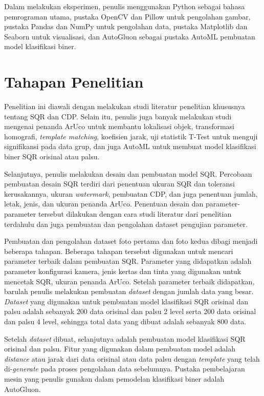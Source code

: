 Dalam melakukan eksperimen, penulis menggunakan Python sebagai bahasa pemrograman utama, pustaka OpenCV dan Pillow untuk pengolahan gambar, pustaka Pandas dan NumPy untuk pengolahan data, pustaka Matplotlib dan Seaborn untuk visualisasi, dan AutoGluon sebagai pustaka AutoML pembuatan model klasifikasi biner.


\section{Tahapan Penelitian}
Penelitian ini diawali dengan melakukan studi literatur penelitian khususnya tentang SQR dan CDP. Selain itu, penulis juga banyak melakukan studi mengenai
penanda ArUco untuk membantu lokalisasi objek, transformasi homografi, \emph{template matching}, koefisien jarak, uji statistik T-Test untuk menguji
signifikansi pada data grup, dan juga AutoML untuk membuat model klasifikasi biner SQR orisinal atau palsu.

Selanjutnya, penulis melakukan desain dan pembuatan model SQR. Percobaan pembuatan desain SQR terdiri dari penentuan ukuran SQR dan toleransi kerusakannya,
ukuran \emph{watermark}, pembuatan CDP, dan juga penentuan jumlah, letak, jenis, dan ukuran penanda ArUco. Penentuan desain dan parameter-parameter tersebut
dilakukan dengan cara studi literatur dari penelitian terdahulu dan juga pembuatan dan pengolahan dataset pengujian parameter.

Pembuatan dan pengolahan dataset foto pertama dan foto kedua dibagi menjadi beberapa tahapan. Beberapa tahapan tersebut digunakan untuk mencari parameter
terbaik dalam pembuatan SQR. Parameter yang didapatkan adalah parameter konfigurasi kamera, jenis kertas dan tinta yang digunakan untuk mencetak SQR, ukuran
penanda ArUco. Setelah parameter terbaik didapatkan, barulah penulis melakukan pembuatan \emph{dataset} dengan jumlah data yang besar. \emph{Dataset} yang
digunakan untuk pembuatan model klasifikasi SQR orisinal dan palsu adalah sebanyak 200 data orisinal dan palsu 2 level serta 200 data orisinal dan palsu 4
level, sehingga total data yang dibuat adalah sebanyak 800 data.

Setelah \emph{dataset} dibuat, selanjutnya adalah pembuatan model klasifikasi SQR orisinal dan palsu. Fitur yang digunakan dalam pembuatan model adalah
\emph{distance} atau jarak dari data orisinal atau data palsu dengan \emph{template} yang telah di-\emph{generate} pada proses pengolahan data sebelumnya.
Pustaka pembelajaran mesin yang penulis gunakan dalam pemodelan klasifikasi biner adalah AutoGluon.


